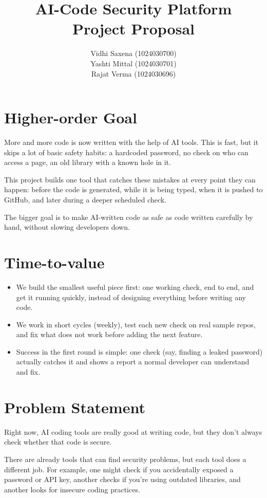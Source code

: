 \documentclass[12pt,a4paper]{article}
\title{\textbf{AI-Code Security Platform}\\
Project Proposal}
\author{
Vidhi Saxena (1024030700)\\
Yashti Mittal (1024030701)\\
Rajat Verma (1024030696)
}
\date{}
\begin{document}
\maketitle

\section{Higher-order Goal}

More and more code is now written with the help of AI tools. This is fast, but it skips a lot of basic safety habits: a hardcoded password, no check on who can access a page, an old library with a known hole in it.

This project builds one tool that catches these mistakes at every point they can happen: before the code is generated, while it is being typed, when it is pushed to GitHub, and later during a deeper scheduled check.

The bigger goal is to make AI-written code as safe as code written carefully by hand, without slowing developers down.

\section{Time-to-value}

\begin{itemize}
    \item We build the smallest useful piece first: one working check, end to end, and get it running quickly, instead of designing everything before writing any code.

    \item We work in short cycles (weekly), test each new check on real sample repos, and fix what does not work before adding the next feature.

    \item Success in the first round is simple: one check (say, finding a leaked password) actually catches it and shows a report a normal developer can understand and fix.
\end{itemize}

\section{Problem Statement}

Right now, AI coding tools are really good at writing code, but they don't always check whether that code is secure.

There are already tools that can find security problems, but each tool does a different job. For example, one might check if you accidentally exposed a password or API key, another checks if you're using outdated libraries, and another looks for insecure coding practices.
\end{document}

